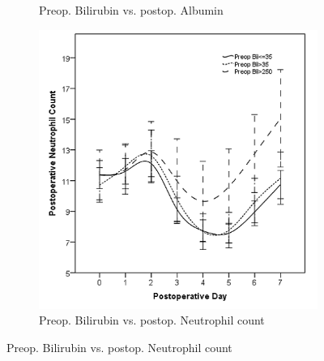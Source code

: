 \begin{figure}[p]
\begin{subfigure}{0.48\textwidth}
		\caption{Preop. Bilirubin vs. postop. Albumin}
		\label{fig:sirs_bil_alb}
	\end{subfigure}
	
	\vspace{1cm}
		
	\begin{subfigure}{0.48\textwidth}
		\centering
		\includegraphics[width=\textwidth]{Figures/sirs_bil_neut}
		\caption{Preop. Bilirubin vs. postop. Neutrophil count}
		\label{fig:sirs_bil_neut}
	\end{subfigure}	
\end{figure}



